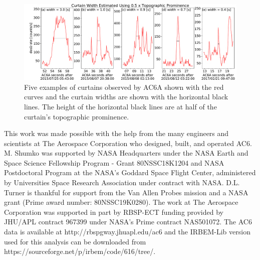 \documentclass[draft]{agujournal2019}
\begin{document}
\begin{figure}
\includegraphics[width=\textwidth]{a_topographic_prominence.pdf}
\caption{Five examples of curtains observed by AC6A shown with the red curves and the curtain widths are shown with the horizontal black lines. The height of the horizontal black lines are at half of the curtain's topographic prominence.}
\label{a_topographic_prominence}
\end{figure}

\acknowledgments
This work was made possible with the help from the many engineers and scientists at The Aerospace Corporation who designed, built, and operated AC6. M. Shumko was supported by NASA Headquarters under the NASA Earth and Space Science Fellowship Program - Grant 80NSSC18K1204 and NASA Postdoctoral Program at the NASA's Goddard Space Flight Center, administered by Universities Space Research Association under contract with NASA. D.L. Turner is thankful for support from the Van Allen Probes mission and a NASA grant (Prime award number: 80NSSC19K0280). The work at The Aerospace Corporation was supported in part by RBSP-ECT funding provided by JHU/APL contract 967399 under NASA's Prime contract NAS501072. The AC6 data is available at http://rbspgway.jhuapl.edu/ac6 and the IRBEM-Lib version used for this analysis can be downloaded from https://sourceforge.net/p/irbem/code/616/tree/.


%
\end{document}
